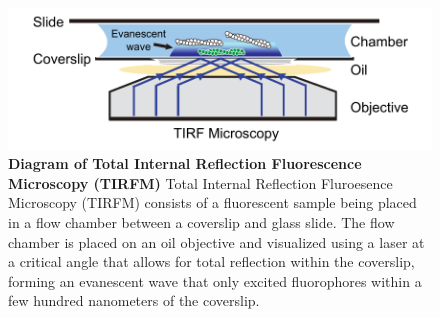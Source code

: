 \begin{figure}
\centering
\includegraphics[width=17cm]{img/ch01/tirf_thesis.pdf}
\caption[Diagram of Total Internal Reflection Fluorescence Microscopy (TIRFM)]{\textbf{Diagram of Total Internal Reflection Fluorescence Microscopy (TIRFM)} Total Internal Reflection Fluroesence Microscopy (TIRFM) consists of a fluorescent sample being placed in a flow chamber between a coverslip and glass slide. The flow chamber is placed on an oil objective and visualized using a laser at a critical angle that allows for total reflection within the coverslip, forming an evanescent wave that only excited fluorophores within a few hundred nanometers of the coverslip. }
\label{fig:tirf}
\end{figure}